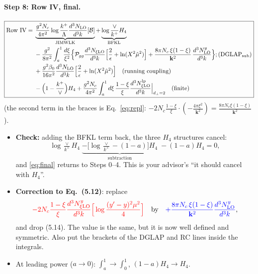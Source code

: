 \documentclass[10pt]{article}
\numberwithin{equation}{section}
\newcommand{\new}[1]{{\color{blue}#1}}
\newcommand{\old}[1]{{\color{red}#1}}
\begin{document}
\paragraph{Step 8: Row IV, final.}
\begin{equation}
\boxed{\begin{aligned}
\text{Row IV}={}&\underbrace{\frac{g^2N_c}{4\pi^2}\log\frac{k^+}{\Lambda}\frac{d^3N_{\rm LO}}{d^3k}[\mathcal B]}_{\rm JIMWLK}+\underbrace{\log\frac{\vee}{k^+}H_4}_{\rm BFKL}\\
&-\frac{g^2}{8\pi^2}\int_a^1\frac{d\xi}{\xi^2}\Big\{\mathcal P_{gg}\frac{d^3N_{\xi\rm LO}}{d^3k}\Big[\frac2\epsilon+\ln(X^2\hat\mu^2)\Big]+\frac{8\pi N_c\,\xi(1-\xi)}{\mathbf k^2}\,\frac{d^3N^y_{\rm LO}}{d^3k}\Big\};\text{(DGLAP$_{\rm sub}$)}\\
&+\frac{g^2\beta_0}{16\pi^2}\frac{d^3N_{\rm LO}}{d^3k}\Big[\frac2\epsilon+\ln(X^2\hat\mu^2)\Big]\quad\text{(running coupling)}\\
&-\Big(1-\frac{k^+}{\vee}\Big)H_4+\frac{g^2N_c}{4\pi^2}\int_a^1d\xi\,\frac{1-\xi}{\xi}\frac{d^3N^{\rm lp}_{\xi\rm LO}}{d^3k}\Big|_{d_\perp=2}\quad\text{(finite)}
\end{aligned}}\label{eq:final}
\end{equation}
(the second term in the braces is Eq.~\eqref{eq:repl}: $-2N_c\frac{1-\xi}{\xi}\cdot(-\frac{4\pi\xi^2}{\mathbf k^2})=\frac{8\pi N_c\xi(1-\xi)}{\mathbf k^2}$).
\begin{itemize}
\item \textbf{Check:} adding the BFKL term back, the three $H_4$ structures cancel:
\begin{equation*}
\log\tfrac{\vee}{k^+}H_4\;\underbrace{-\big[\log\tfrac{\vee}{k^+}-(1-a)\big]H_4}_{\text{subtraction}}\;-(1-a)H_4=0 ,
\end{equation*}
and \eqref{eq:final} returns to Steps 0--4. This is your advisor's ``it should cancel with $H_4$''.
\item \textbf{Correction to Eq.~(5.12)}: replace
\begin{equation*}
\old{-2N_c\frac{1-\xi}{\xi}\frac{d^3N^y_{\xi\rm LO}}{d^3k}\Big[\log\frac{(y'-y)^2\mu^2}{4}\Big]}\quad\text{by}\quad\new{+\frac{8\pi N_c\,\xi(1-\xi)}{\mathbf k^2}\frac{d^3N^y_{\rm LO}}{d^3k}},
\end{equation*}
and drop (5.14). The value is the same, but it is now well defined and symmetric. Also put the brackets of the DGLAP and RC lines inside the integrals.
\item At leading power ($a\to0$): $\int_a^1\to\int_0^1$, $(1-a)H_4\to H_4$.
\end{itemize}
\end{document}

